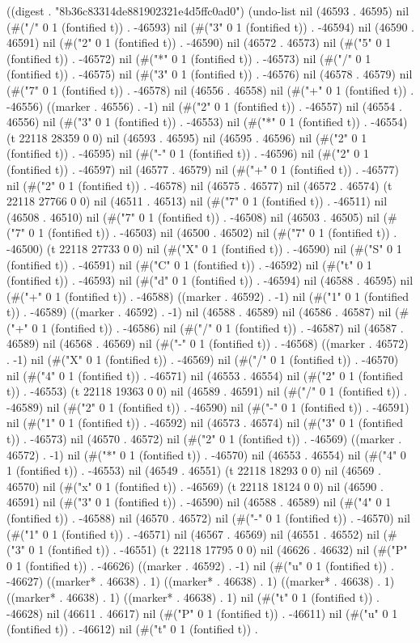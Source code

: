 
((digest . "8b36c83314de881902321e4d5ffc0ad0") (undo-list nil (46593 . 46595) nil (#("/" 0 1 (fontified t)) . -46593) nil (#("3" 0 1 (fontified t)) . -46594) nil (46590 . 46591) nil (#("2" 0 1 (fontified t)) . -46590) nil (46572 . 46573) nil (#("5" 0 1 (fontified t)) . -46572) nil (#("*" 0 1 (fontified t)) . -46573) nil (#("/" 0 1 (fontified t)) . -46575) nil (#("3" 0 1 (fontified t)) . -46576) nil (46578 . 46579) nil (#("7" 0 1 (fontified t)) . -46578) nil (46556 . 46558) nil (#("+" 0 1 (fontified t)) . -46556) ((marker . 46556) . -1) nil (#("2" 0 1 (fontified t)) . -46557) nil (46554 . 46556) nil (#("3" 0 1 (fontified t)) . -46553) nil (#("*" 0 1 (fontified t)) . -46554) (t 22118 28359 0 0) nil (46593 . 46595) nil (46595 . 46596) nil (#("2" 0 1 (fontified t)) . -46595) nil (#("-" 0 1 (fontified t)) . -46596) nil (#("2" 0 1 (fontified t)) . -46597) nil (46577 . 46579) nil (#("+" 0 1 (fontified t)) . -46577) nil (#("2" 0 1 (fontified t)) . -46578) nil (46575 . 46577) nil (46572 . 46574) (t 22118 27766 0 0) nil (46511 . 46513) nil (#("7" 0 1 (fontified t)) . -46511) nil (46508 . 46510) nil (#("7" 0 1 (fontified t)) . -46508) nil (46503 . 46505) nil (#("7" 0 1 (fontified t)) . -46503) nil (46500 . 46502) nil (#("7" 0 1 (fontified t)) . -46500) (t 22118 27733 0 0) nil (#("X" 0 1 (fontified t)) . -46590) nil (#("S" 0 1 (fontified t)) . -46591) nil (#("C" 0 1 (fontified t)) . -46592) nil (#("t" 0 1 (fontified t)) . -46593) nil (#("d" 0 1 (fontified t)) . -46594) nil (46588 . 46595) nil (#("+" 0 1 (fontified t)) . -46588) ((marker . 46592) . -1) nil (#("1" 0 1 (fontified t)) . -46589) ((marker . 46592) . -1) nil (46588 . 46589) nil (46586 . 46587) nil (#("+" 0 1 (fontified t)) . -46586) nil (#("/" 0 1 (fontified t)) . -46587) nil (46587 . 46589) nil (46568 . 46569) nil (#("-" 0 1 (fontified t)) . -46568) ((marker . 46572) . -1) nil (#("X" 0 1 (fontified t)) . -46569) nil (#("/" 0 1 (fontified t)) . -46570) nil (#("4" 0 1 (fontified t)) . -46571) nil (46553 . 46554) nil (#("2" 0 1 (fontified t)) . -46553) (t 22118 19363 0 0) nil (46589 . 46591) nil (#("/" 0 1 (fontified t)) . -46589) nil (#("2" 0 1 (fontified t)) . -46590) nil (#("-" 0 1 (fontified t)) . -46591) nil (#("1" 0 1 (fontified t)) . -46592) nil (46573 . 46574) nil (#("3" 0 1 (fontified t)) . -46573) nil (46570 . 46572) nil (#("2" 0 1 (fontified t)) . -46569) ((marker . 46572) . -1) nil (#("*" 0 1 (fontified t)) . -46570) nil (46553 . 46554) nil (#("4" 0 1 (fontified t)) . -46553) nil (46549 . 46551) (t 22118 18293 0 0) nil (46569 . 46570) nil (#("x" 0 1 (fontified t)) . -46569) (t 22118 18124 0 0) nil (46590 . 46591) nil (#("3" 0 1 (fontified t)) . -46590) nil (46588 . 46589) nil (#("4" 0 1 (fontified t)) . -46588) nil (46570 . 46572) nil (#("-" 0 1 (fontified t)) . -46570) nil (#("1" 0 1 (fontified t)) . -46571) nil (46567 . 46569) nil (46551 . 46552) nil (#("3" 0 1 (fontified t)) . -46551) (t 22118 17795 0 0) nil (46626 . 46632) nil (#("P" 0 1 (fontified t)) . -46626) ((marker . 46592) . -1) nil (#("u" 0 1 (fontified t)) . -46627) ((marker* . 46638) . 1) ((marker* . 46638) . 1) ((marker* . 46638) . 1) ((marker* . 46638) . 1) ((marker* . 46638) . 1) nil (#("t" 0 1 (fontified t)) . -46628) nil (46611 . 46617) nil (#("P" 0 1 (fontified t)) . -46611) nil (#("u" 0 1 (fontified t)) . -46612) nil (#("t" 0 1 (fontified t)) . 